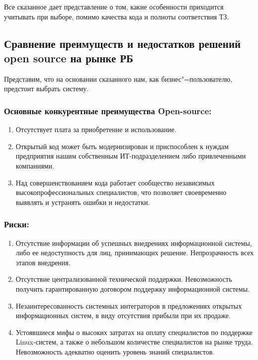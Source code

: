 \documentclass[10pt, a5paper]{article}
\begin{document}
Все сказанное дает представление о том, какие особенности приходится учитывать при выборе, помимо качества кода и полноты соответствия ТЗ.

\subsection*{Сравнение преимуществ и недостатков решений open source на рынке РБ}

Представим, что на основании сказанного нам, как бизнес"=пользователю,  предстоит выбрать систему.

\subsubsection*{Основные конкурентные преимущества Open-source:}

\begin{enumerate}
  \item Отсутствует плата за приобретение и использование.
  \item Открытый код может быть модернизирован и приспособлен к нуждам предприятия нашим собственным ИТ-подразделением либо привлеченными компаниями.
  \item Над совершенствованием кода работает сообщество независимых высокопрофессиональных специалистов, что позволяет своевременно выявлять и устранять ошибки и недостатки.
\end{enumerate}

\subsubsection*{Риски:}

\begin{enumerate}
  \item Отсутствие информации об успешных внедрениях информационной системы, либо ее недоступность для лиц, принимающих решение. Непрозрачность всех этапов внедрения.
  \item Отсутствие централизованной технической поддержки. Невозможность получить гарантированную договором поддержку информационной системы.
  \item Незаинтересованность системных интеграторов в предложениях открытых информационных систем, в виду отсутствия прибыли при их продаже.
  \item Устоявшиеся мифы о высоких затратах на оплату специалистов по поддержке Linux-систем, а также о небольшом количестве специалистов на рынке труда. Невозможность адекватно оценить уровень знаний специалистов.
\end{enumerate}
\end{document}
